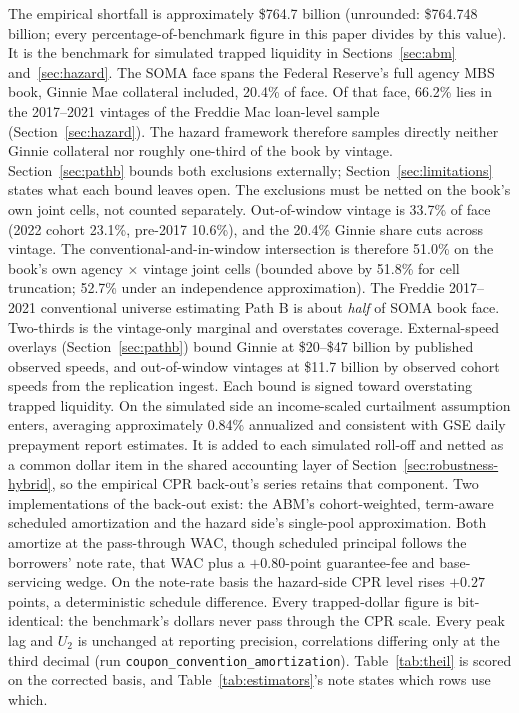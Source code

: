 \documentclass[12pt]{article}
\begin{document}
The empirical shortfall is approximately \$764.7 billion (unrounded: \$764.748 billion; every percentage-of-benchmark figure in this paper divides by this value). It is the benchmark for simulated trapped liquidity in Sections~\ref{sec:abm} and~\ref{sec:hazard}. The SOMA face spans the Federal Reserve's full agency MBS book, Ginnie Mae collateral included, 20.4\% of face. Of that face, 66.2\% lies in the 2017--2021 vintages of the Freddie Mac loan-level sample (Section~\ref{sec:hazard}). The hazard framework therefore samples directly neither Ginnie collateral nor roughly one-third of the book by vintage. Section~\ref{sec:pathb} bounds both exclusions externally; Section~\ref{sec:limitations} states what each bound leaves open. The exclusions must be netted on the book's own joint cells, not counted separately. Out-of-window vintage is 33.7\% of face (2022 cohort 23.1\%, pre-2017 10.6\%), and the 20.4\% Ginnie share cuts across vintage. The conventional-and-in-window intersection is therefore 51.0\% on the book's own agency $\times$ vintage joint cells (bounded above by 51.8\% for cell truncation; 52.7\% under an independence approximation). The Freddie 2017--2021 conventional universe estimating Path B is about \emph{half} of SOMA book face. Two-thirds is the vintage-only marginal and overstates coverage. External-speed overlays (Section~\ref{sec:pathb}) bound Ginnie at \$20--\$47 billion by published observed speeds, and out-of-window vintages at \$11.7 billion by observed cohort speeds from the replication ingest. Each bound is signed toward overstating trapped liquidity. On the simulated side an income-scaled curtailment assumption enters, averaging approximately 0.84\% annualized and consistent with GSE daily prepayment report estimates. It is added to each simulated roll-off and netted as a common dollar item in the shared accounting layer of Section~\ref{sec:robustness-hybrid}, so the empirical CPR back-out's series retains that component. Two implementations of the back-out exist: the ABM's cohort-weighted, term-aware scheduled amortization and the hazard side's single-pool approximation. Both amortize at the pass-through WAC, though scheduled principal follows the borrowers' note rate, that WAC plus a $+0.80$-point guarantee-fee and base-servicing wedge. On the note-rate basis the hazard-side CPR level rises $+0.27$ points, a deterministic schedule difference. Every trapped-dollar figure is bit-identical: the benchmark's dollars never pass through the CPR scale. Every peak lag and $U_2$ is unchanged at reporting precision, correlations differing only at the third decimal (run \texttt{coupon\_convention\_amortization}). Table~\ref{tab:theil} is scored on the corrected basis, and Table~\ref{tab:estimators}'s note states which rows use which.
\end{document}

